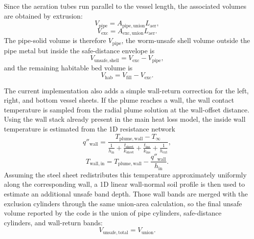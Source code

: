 \documentclass{article}
\begin{document}
Since the aeration tubes run parallel to the vessel length, the associated
volumes are obtained by extrusion:
\begin{equation}
V_{\mathrm{pipe}} = A_{\mathrm{pipe,union}} L_{\mathrm{aer}},
\end{equation}
\begin{equation}
V_{\mathrm{exc}} = A_{\mathrm{exc,union}} L_{\mathrm{aer}}.
\end{equation}
The pipe-solid volume is therefore $V_{\mathrm{pipe}}$, the worm-unsafe shell
volume outside the pipe metal but inside the safe-distance envelope is
\begin{equation}
V_{\mathrm{unsafe,shell}} = V_{\mathrm{exc}} - V_{\mathrm{pipe}},
\end{equation}
and the remaining habitable bed volume is
\begin{equation}
V_{\mathrm{hab}} = V_{\mathrm{fill}} - V_{\mathrm{exc}}.
\end{equation}

The current implementation also adds a simple wall-return correction for the
left, right, and bottom vessel sheets. If the plume reaches a wall, the wall
contact temperature is sampled from the radial plume solution at the
wall-offset distance. Using the wall stack already present in the main heat
loss model, the inside wall temperature is estimated from the 1D resistance
network
\begin{equation}
q''_{\mathrm{wall}}
=
\frac{T_{\mathrm{plume,wall}} - T_{\infty}}
{\frac{1}{h_{\mathrm{in}}}
+ \frac{t_{\mathrm{sheet}}}{k_{\mathrm{sheet}}}
+ \frac{t_{\mathrm{ins}}}{k_{\mathrm{ins}}}
+ \frac{1}{h_{\mathrm{ext}}}},
\end{equation}
\begin{equation}
T_{\mathrm{wall,in}}
=
T_{\mathrm{plume,wall}} - \frac{q''_{\mathrm{wall}}}{h_{\mathrm{in}}}.
\end{equation}
Assuming the steel sheet redistributes this temperature approximately
uniformly along the corresponding wall, a 1D linear wall-normal soil profile
is then used to estimate an additional unsafe band depth. Those wall bands
are merged with the exclusion cylinders through the same union-area
calculation, so the final unsafe volume reported by the code is the union of
pipe cylinders, safe-distance cylinders, and wall-return bands:
\begin{equation}
V_{\mathrm{unsafe,total}} = V_{\mathrm{union}}.
\end{equation}
\end{document}
